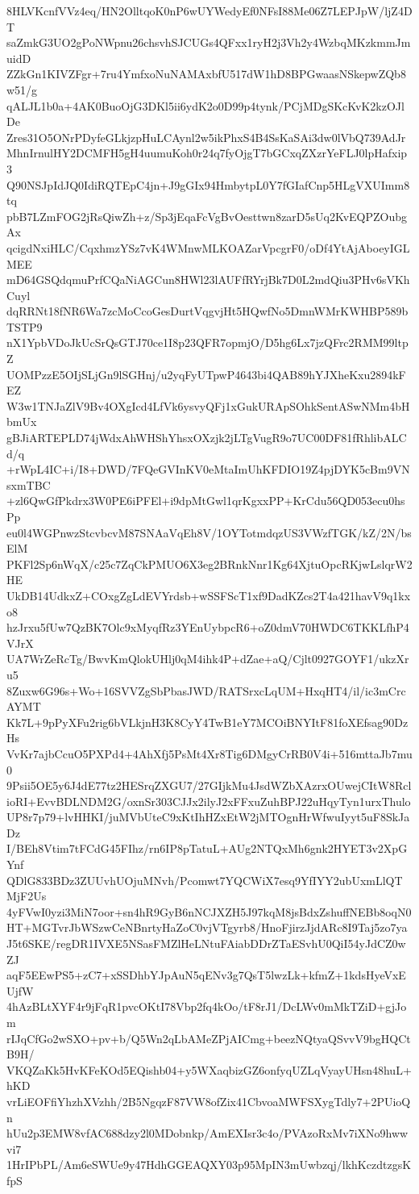 8HLVKcnfVVz4eq/HN2OlltqoK0nP6wUYWedyEf0NFsI88Me06Z7LEPJpW/ljZ4DT
saZmkG3UO2gPoNWpnu26chsvhSJCUGs4QFxx1ryH2j3Vh2y4WzbqMKzkmmJmuidD
ZZkGn1KIVZFgr+7ru4YmfxoNuNAMAxbfU517dW1hD8BPGwaasNSkepwZQb8w51/g
qALJL1b0a+4AK0BuoOjG3DKl5ii6ydK2o0D99p4tynk/PCjMDgSKcKvK2kzOJlDe
Zres31O5ONrPDyfeGLkjzpHuLCAynl2w5ikPhxS4B4SsKaSAi3dw0lVbQ739AdJr
MhnIrnulHY2DCMFH5gH4uumuKoh0r24q7fyOjgT7bGCxqZXzrYeFLJ0lpHafxip3
Q90NSJpIdJQ0IdiRQTEpC4jn+J9gGIx94HmbytpL0Y7fGIafCnp5HLgVXUImm8tq
pbB7LZmFOG2jRsQiwZh+z/Sp3jEqaFcVgBvOesttwn8zarD5sUq2KvEQPZOubgAx
qcigdNxiHLC/CqxhmzYSz7vK4WMnwMLKOAZarVpcgrF0/oDf4YtAjAboeyIGLMEE
mD64GSQdqmuPrfCQaNiAGCun8HWl23lAUFfRYrjBk7D0L2mdQiu3PHv6sVKhCuyl
dqRRNt18fNR6Wa7zcMoCcoGesDurtVqgvjHt5HQwfNo5DmnWMrKWHBP589bTSTP9
nX1YpbVDoJkUcSrQsGTJ70ce1I8p23QFR7opmjO/D5hg6Lx7jzQFrc2RMM99ltpZ
UOMPzzE5OIjSLjGn9lSGHnj/u2yqFyUTpwP4643bi4QAB89hYJXheKxu2894kFEZ
W3w1TNJaZlV9Bv4OXgIcd4LfVk6ysvyQFj1xGukURApSOhkSentASwNMm4bHbmUx
gBJiARTEPLD74jWdxAhWHShYhsxOXzjk2jLTgVugR9o7UC00DF81fRhlibALCd/q
+rWpL4IC+i/I8+DWD/7FQeGVInKV0eMtaImUhKFDIO19Z4pjDYK5cBm9VNsxmTBC
+zl6QwGfPkdrx3W0PE6iPFEl+i9dpMtGwl1qrKgxxPP+KrCdu56QD053ecu0hsPp
eu0l4WGPnwzStcvbcvM87SNAaVqEh8V/1OYTotmdqzUS3VWzfTGK/kZ/2N/bsElM
PKFl2Sp6nWqX/c25c7ZqCkPMUO6X3eg2BRnkNnr1Kg64XjtuOpcRKjwLslqrW2HE
UkDB14UdkxZ+COxgZgLdEVYrdsb+wSSFScT1xf9DadKZcs2T4a421havV9q1kxo8
hzJrxu5fUw7QzBK7Olc9xMyqfRz3YEnUybpcR6+oZ0dmV70HWDC6TKKLfhP4VJrX
UA7WrZeRcTg/BwvKmQlokUHlj0qM4ihk4P+dZae+aQ/Cjlt0927GOYF1/ukzXru5
8Zuxw6G96s+Wo+16SVVZgSbPbasJWD/RATSrxcLqUM+HxqHT4/il/ic3mCrcAYMT
Kk7L+9pPyXFu2rig6bVLkjnH3K8CyY4TwB1eY7MCOiBNYItF81foXEfsag90DzHs
VvKr7ajbCcuO5PXPd4+4AhXfj5PsMt4Xr8Tig6DMgyCrRB0V4i+516mttaJb7mu0
9Psii5OE5y6J4dE77tz2HESrqZXGU7/27GIjkMu4JsdWZbXAzrxOUwejCItW8Rcl
ioRI+EvvBDLNDM2G/oxnSr303CJJx2ilyJ2xFFxuZuhBPJ22uHqyTyn1urxThulo
UP8r7p79+lvHHKI/juMVbUteC9xKtIhHZxEtW2jMTOgnHrWfwuIyyt5uF8SkJaDz
I/BEh8Vtim7tFCdG45FIhz/rn6IP8pTatuL+AUg2NTQxMh6gnk2HYET3v2XpGYnf
QDlG833BDz3ZUUvhUOjuMNvh/Pcomwt7YQCWiX7esq9YfIYY2ubUxmLlQTMjF2Us
4yFVwI0yzi3MiN7oor+sn4hR9GyB6nNCJXZH5J97kqM8jsBdxZshuffNEBb8oqN0
HT+MGTvrJbWSzwCeNBnrtyHaZoC0vjVTgyrb8/HnoFjirzJjdARc8I9Taj5zo7ya
J5t6SKE/regDR1IVXE5NSasFMZlHeLNtuFAiabDDrZTaESvhU0QiI54yJdCZ0wZJ
aqF5EEwPS5+zC7+xSSDhbYJpAuN5qENv3g7QsT5lwzLk+kfmZ+1kdsHyeVxEUjfW
4hAzBLtXYF4r9jFqR1pvcOKtI78Vbp2fq4kOo/tF8rJ1/DcLWv0mMkTZiD+gjJom
rIJqCfGo2wSXO+pv+b/Q5Wn2qLbAMeZPjAICmg+beezNQtyaQSvvV9bgHQCtB9H/
VKQZaKk5HvKFeKOd5EQishb04+y5WXaqbizGZ6onfyqUZLqVyayUHsn48huL+hKD
vrLiEOFfiYhzhXVzhh/2B5NgqzF87VW8ofZix41CbvoaMWFSXygTdly7+2PUioQn
hUu2p3EMW8vfAC688dzy2l0MDobnkp/AmEXIsr3c4o/PVAzoRxMv7iXNo9hwwvi7
1HrIPbPL/Am6eSWUe9y47HdhGGEAQXY03p95MpIN3mUwbzqj/lkhKczdtzgsKfpS
